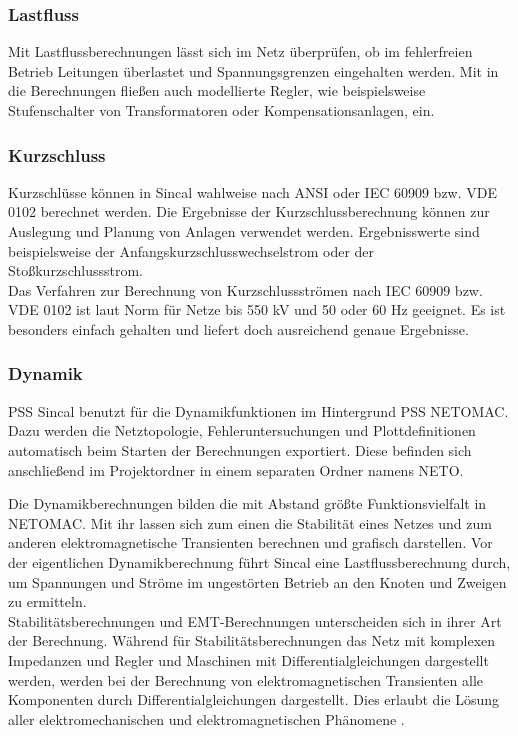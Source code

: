 \documentclass{scrartcl}
\begin{document}
\begin{onehalfspace}
\subsubsection{Lastfluss}
Mit Lastflussberechnungen lässt sich im Netz überprüfen, ob im fehlerfreien Betrieb Leitungen überlastet und Spannungsgrenzen eingehalten werden. Mit in die Berechnungen fließen auch modellierte Regler, wie beispielsweise Stufenschalter von Transformatoren oder Kompensationsanlagen, ein.

\subsubsection{Kurzschluss}
Kurzschlüsse können in Sincal wahlweise nach ANSI oder IEC 60909 bzw. VDE 0102 berechnet werden. Die Ergebnisse der Kurzschlussberechnung können zur Auslegung und Planung von Anlagen verwendet werden. Ergebnisswerte sind beispielsweise der Anfangskurzschlusswechselstrom oder der Stoßkurzschlussstrom. \\
Das Verfahren zur Berechnung von Kurzschlussströmen nach IEC 60909 bzw. VDE 0102 ist laut Norm für Netze bis 550 kV und 50 oder 60 Hz geeignet. Es ist besonders einfach gehalten und liefert doch ausreichend genaue Ergebnisse.


\subsubsection{Dynamik}
PSS Sincal benutzt für die Dynamikfunktionen im Hintergrund PSS NETOMAC. Dazu werden die Netztopologie, Fehleruntersuchungen und Plottdefinitionen automatisch beim Starten der Berechnungen exportiert. Diese befinden sich anschließend im Projektordner in einem separaten Ordner namens \glqq NETO\grqq.

Die Dynamikberechnungen bilden die mit Abstand größte Funktionsvielfalt in NETOMAC. Mit ihr lassen sich zum einen die Stabilität eines Netzes und zum anderen elektromagnetische Transienten berechnen und grafisch darstellen. Vor der eigentlichen Dynamikberechnung führt Sincal eine Lastflussberechnung durch, um Spannungen und Ströme im ungestörten Betrieb an den Knoten und Zweigen zu ermitteln. \\
Stabilitätsberechnungen und EMT-Berechnungen unterscheiden sich in ihrer Art der Berechnung. Während für Stabilitätsberechnungen das Netz mit komplexen Impedanzen und Regler und Maschinen mit Differentialgleichungen dargestellt werden, werden bei der Berechnung von elektromagnetischen Transienten alle Komponenten durch Differentialgleichungen dargestellt. Dies erlaubt die Lösung aller elektromechanischen und elektromagnetischen Phänomene \cite[Verfahrensbeschreibung $\rightarrow$ Dynamik]{netomac-hilfe}.


\end{onehalfspace}
\end{document}
